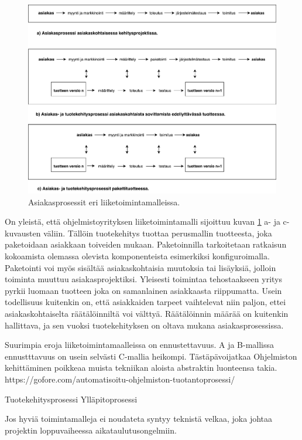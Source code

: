 \documentclass[finnish,12pt,a4paper,pdftex]{article}
\begin{document}
\begin{figure}[!h]
    \centering
    \includegraphics[scale=0.45]{asiakasprosessi.pdf}
    \caption{Asiakasprosessit eri liiketoimintamalleissa.}
    \label{fig:asiakasprosessi}
\end{figure}

On yleistä, että ohjelmistoyrityksen liiketoimintamalli sijoittuu kuvan \ref{fig:asiakasprosessi} a- ja c-kuvausten väliin. Tällöin tuotekehitys tuottaa perusmallin tuotteesta, joka paketoidaan asiakkaan toiveiden mukaan. Paketoinnilla tarkoitetaan ratkaisun kokoamista olemassa olevista komponenteista esimerkiksi konfiguroimalla. Paketointi voi myös sisältää asiakaskohtaisia muutoksia tai lisäyksiä, jolloin toiminta muuttuu asiakasprojektiksi. Yleisesti toimintaa tehostaakseen yritys pyrkii luomaan tuotteen joka on samanlainen asiakkaasta riippumatta. Usein todellisuus kuitenkin on, että asiakkaiden tarpeet vaihtelevat niin paljon, ettei asiakaskohtaiselta räätälöinniltä voi välttyä. Räätälöinnin määrää on kuitenkin hallittava, ja sen vuoksi tuotekehityksen on oltava mukana asiakasprosessissa.

Suurimpia eroja liiketoimintamaalleissa on ennustettavuus. A ja B-mallissa ennustttavuus on usein selvästi C-mallia heikompi. 
Tästäpävoijatkaa
Ohjelmiston kehittäminen poikkeaa muista tekniikan aloista abstraktin luonteensa takia. 
https://gofore.com/automatisoitu-ohjelmiston-tuotantoprosessi/ 

Tuotekehitysprosessi
Ylläpitoprosessi

Jos hyviä toimintamalleja ei noudateta syntyy teknistä velkaa, joka johtaa projektin loppuvaiheessa aikataulutusongelmiin.
\end{document}
